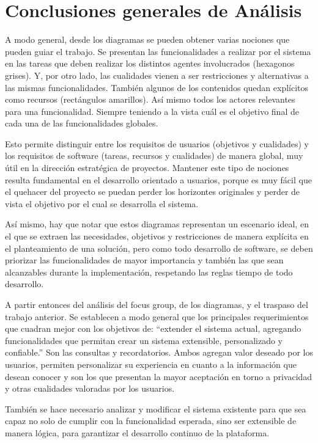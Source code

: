 \section{Conclusiones generales de Análisis}
    \par A modo general, desde los diagramas se pueden obtener varias nociones que pueden guiar el trabajo. Se presentan las funcionalidades a realizar por el sistema en las tareas que deben realizar los distintos agentes involucrados (hexagonos grises). Y, por otro lado, las cualidades vienen a ser restricciones y alternativas a las mismas funcionalidades. También algunos de los contenidos quedan explícitos como recursos (rectángulos amarillos). Así mismo todos los actores relevantes para una funcionalidad. Siempre teniendo a la vista cuál es el objetivo final de cada una de las funcionalidades globales.

    \par Esto permite distinguir entre los requisitos de usuarios (objetivos y cualidades) y los requisitos de software (tareas, recursos y cualidades) de manera global, muy útil en la dirección estratégica de proyectos. Mantener este tipo de nociones resulta fundamental en el desarrollo orientado a usuarios, porque es muy fácil que el quehacer del proyecto se puedan perder los horizontes originales y perder de vista el objetivo por el cual se desarrolla el sistema.
    \par Así mismo, hay que notar que estos diagramas representan un escenario ideal, en el que se extraen las necesidades, objetivos y restricciones de manera explícita en el planteamiento de una solución, pero como todo desarrollo de software, se deben priorizar las funcionalidades de mayor importancia y también las que sean alcanzables durante la implementación, respetando las reglas tiempo de todo desarrollo.
    \par A partir entonces del análisis del focus group, de los diagramas, y el traspaso del trabajo anterior. Se establecen a modo general que los principales requerimientos que cuadran mejor con los objetivos de: “extender el sistema actual, agregando funcionalidades que permitan crear un sistema extensible, personalizado y confiable.” Son las consultas y recordatorios. Ambos agregan valor deseado por los usuarios, permiten personalizar su experiencia en cuanto a la información que desean conocer y son los que presentan la mayor aceptación en torno a privacidad y otras cualidades valoradas por los usuarios.
    \par También se hace necesario analizar y modificar el sistema existente para que sea capaz no solo de cumplir con la funcionalidad esperada, sino ser extensible de manera lógica, para garantizar el desarrollo continuo de la plataforma.

